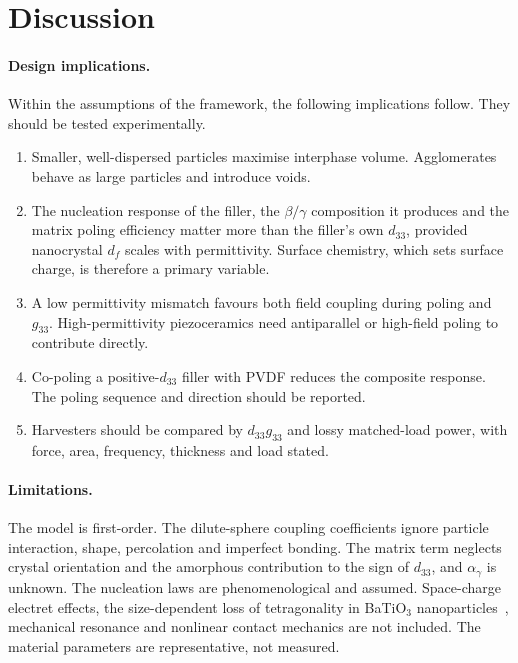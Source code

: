 \documentclass[11pt,a4paper]{article}
\newcommand{\BTO}{BaTiO$_3$}
\newcommand{\dt}{d_{33}}
\begin{document}
\section{Discussion}

\paragraph{Design implications.} Within the assumptions of the framework, the following implications follow. They should be tested experimentally.
\begin{enumerate}
\item Smaller, well-dispersed particles maximise interphase volume. Agglomerates behave as large particles and introduce voids.
\item The nucleation response of the filler, the $\beta/\gamma$ composition it produces and the matrix poling efficiency matter more than the filler's own $\dt$, provided nanocrystal $d_f$ scales with permittivity. Surface chemistry, which sets surface charge, is therefore a primary variable.
\item A low permittivity mismatch favours both field coupling during poling and $g_{33}$. High-permittivity piezoceramics need antiparallel or high-field poling to contribute directly.
\item Co-poling a positive-$\dt$ filler with PVDF reduces the composite response. The poling sequence and direction should be reported.
\item Harvesters should be compared by $\dt g_{33}$ and lossy matched-load power, with force, area, frequency, thickness and load stated.
\end{enumerate}

\paragraph{Limitations.} The model is first-order. The dilute-sphere coupling coefficients ignore particle interaction, shape, percolation and imperfect bonding. The matrix term neglects crystal orientation and the amorphous contribution to the sign of $\dt$, and $\alpha_\gamma$ is unknown. The nucleation laws are phenomenological and assumed. Space-charge electret effects, the size-dependent loss of tetragonality in \BTO{} nanoparticles~\cite{Hoshina2008}, mechanical resonance and nonlinear contact mechanics are not included. The material parameters are representative, not measured.
\end{document}
